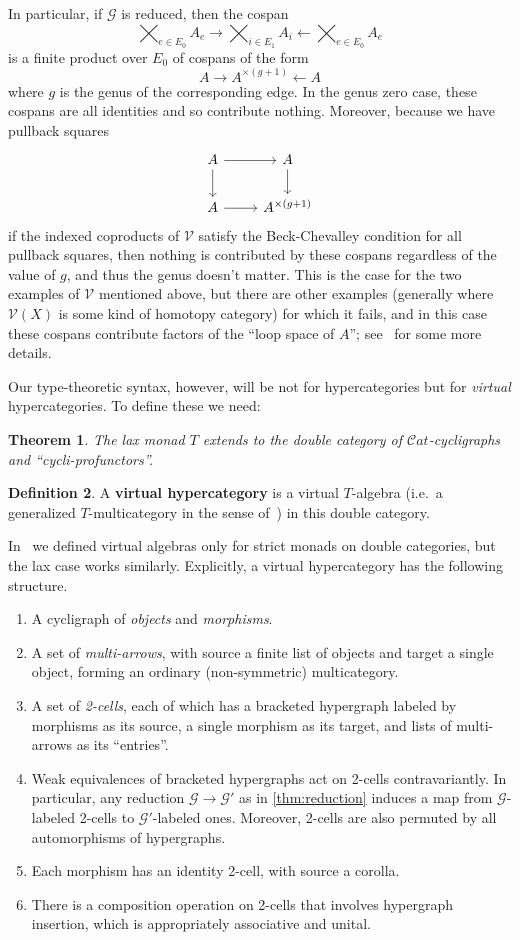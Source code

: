 \documentclass{article}
\newtheorem{thm}{Theorem}[section]
\theoremstyle{definition}
\newtheorem{defn}[thm]{Definition}
\theoremstyle{remark}
\def\G{\mathcal{G}}
\def\V{\mathscr{V}}
\def\Cat{\ensuremath{\mathcal{C}\mathit{at}}}
\let\ot\leftarrow
\begin{document}
In particular, if $\G$ is reduced, then the cospan
\[ \bigtimes_{e\in E_0} A_e \to \bigtimes_{i\in E_1} A_{i} \ot \bigtimes_{e\in E_0} A_e \]
is a finite product over $E_0$ of cospans of the form
\[ A \to A^{\times (g+1)} \ot A \]
where $g$ is the genus of the corresponding edge.
In the genus zero case, these cospans are all identities and so contribute nothing.
Moreover, because we have pullback squares
\[
\begin{tikzcd}
  A \ar[r] \ar[d] & A \ar[d] \\ A \ar[r] & A^{\times (g+1)}
\end{tikzcd}
\]
if the indexed coproducts of $\V$ satisfy the Beck-Chevalley condition for all pullback squares, then nothing is contributed by these cospans regardless of the value of $g$, and thus the genus doesn't matter.
This is the case for the two examples of $\V$ mentioned above, but there are other examples (generally where $\V(X)$ is some kind of homotopy category) for which it fails, and in this case these cospans contribute factors of the ``loop space of $A$''; see~\cite{ps:indexed} for some more details.

Our type-theoretic syntax, however, will be not for hypercategories but for \emph{virtual} hypercategories.
To define these we need:

\begin{thm}
  The lax monad $T$ extends to the double category of $\Cat$-cycligraphs and ``cycli-profunctors''.
\end{thm}

\begin{defn}
  A \textbf{virtual hypercategory} is a virtual $T$-algebra (i.e.\ a generalized $T$-multicategory in the sense of~\cite{cs:multicats}) in this double category.
\end{defn}

In~\cite{cs:multicats} we defined virtual algebras only for strict monads on double categories, but the lax case works similarly.
Explicitly, a virtual hypercategory has the following structure.
\begin{enumerate}
\item A cycligraph of \emph{objects} and \emph{morphisms}.
\item A set of \emph{multi-arrows}, with source a finite list of objects and target a single object, forming an ordinary (non-symmetric) multicategory.
\item A set of \emph{2-cells}, each of which has a bracketed hypergraph labeled by morphisms as its source, a single morphism as its target, and lists of multi-arrows as its ``entries''.
\item Weak equivalences of bracketed hypergraphs act on 2-cells contravariantly.
  In particular, any reduction $\G\to \G'$ as in \cref{thm:reduction} induces a map from $\G$-labeled 2-cells to $\G'$-labeled ones.
  Moreover, 2-cells are also permuted by all automorphisms of hypergraphs.
\item Each morphism has an identity 2-cell, with source a corolla.
\item There is a composition operation on 2-cells that involves hypergraph insertion, which is appropriately associative and unital.
\end{enumerate}
\end{document}
